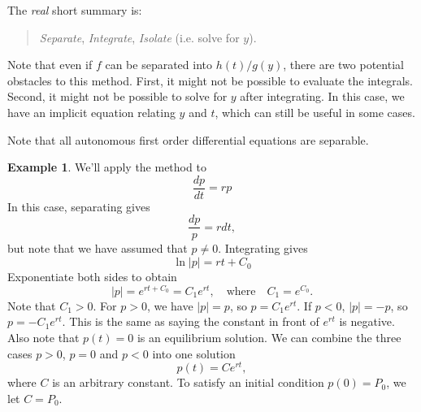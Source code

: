 \documentclass[reqno]{immbook}
\numberwithin{equation}{chapter}
\numberwithin{question}{section}
\numberwithin{theorem}{chapter}
\numberwithin{figure}{chapter}
\theoremstyle{definition}
\newtheorem{example}{Example}[section]
\begin{document}
The \emph{real} short summary is:
\begin{quote}
  \emph{Separate}, \emph{Integrate}, \emph{Isolate} (i.e. solve for $y$).
\end{quote}
Note that even if $f$ can be separated into $h(t)/g(y)$, there are two potential obstacles
to this method. First, it might not be possible to evaluate the integrals.
Second, it might not be possible to solve for $y$ after integrating.
In this case, we have an implicit equation relating $y$ and $t$, which can still
be useful in some cases.

Note that all autonomous first order differential equations are separable.

\begin{example}
We'll apply the method to
\begin{equation}
   \frac{dp}{dt} = r p
\end{equation}
In this case, separating gives
\begin{equation}
   \frac{dp}{p} = r dt,
\end{equation}
but note that we have assumed that $p\ne 0$.
Integrating gives
\begin{equation}
   \ln | p | = rt+C_0
\end{equation}
Exponentiate both sides to obtain
\begin{equation}
  |p| = e^{rt+C_0} = C_1e^{rt}, \quad \textrm{where} \quad C_1 = e^{C_0}.
\end{equation}
Note that $C_1 > 0$.
For $p > 0$, we have $|p|=p$, so $p=C_1e^{rt}$.
If $p < 0$, $|p| = -p$, so $p = -C_1e^{rt}$.
This is the same as saying the constant in front of $e^{rt}$ is negative.
Also note that $p(t)=0$ is an equilibrium solution.
We can combine the three cases $p>0$, $p=0$ and $p<0$ into one
solution
\begin{equation}
   p(t) = Ce^{rt},
\end{equation}
where $C$ is an arbitrary constant.
To satisfy an initial condition $p(0)=P_0$, we let $C=P_0$.
\end{example}
\end{document}
